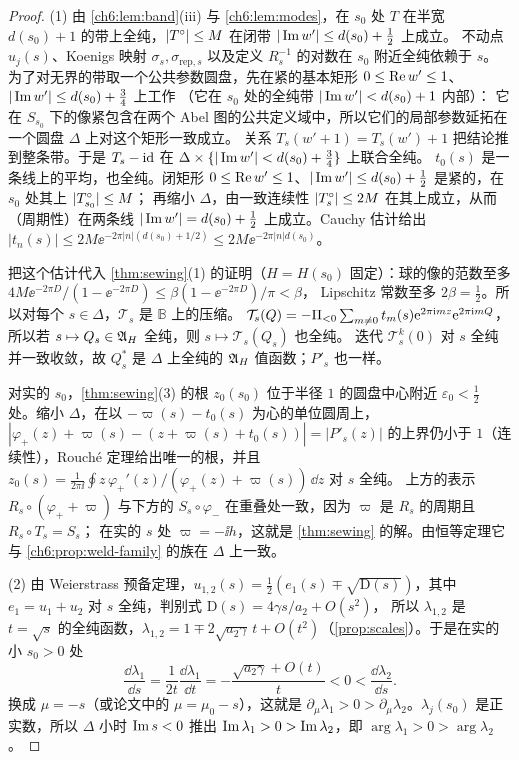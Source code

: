 \begin{proof}
(1) 由 \cref{ch6:lem:band}(iii) 与 \cref{ch6:lem:modes}，在 $s_0$ 处 $T$ 在半宽 $d(s_0)+1$ 的带上全纯，$|T^{\circ}|\le M$ 在闭带 $|\operatorname{Im} w'|\le d(s_0)+\tfrac12$ 上成立。
不动点 $u_j(s)$、Koenigs 映射 $\sigma_s,\sigma_{\mathrm{rep},s}$ 以及定义 $R_s^{-1}$ 的对数在 $s_0$ 附近全纯依赖于 $s$。
为了对无界的带取一个公共参数圆盘，先在紧的基本矩形 $0\le\operatorname{Re} w'\le1$、$|\operatorname{Im} w'|\le d(s_0)+\tfrac34$ 上工作
（它在 $s_0$ 处的全纯带 $|\operatorname{Im} w'|<d(s_0)+1$ 内部）：
它在 $S_{s_0}$ 下的像紧包含在两个 Abel 图的公共定义域中，所以它们的局部参数延拓在一个圆盘 $\Delta$ 上对这个矩形一致成立。
关系 $T_s(w'+1)=T_s(w')+1$ 把结论推到整条带。于是 $T_s-\mathrm{id}$ 在 $\Delta\times\{|\operatorname{Im} w'|<d(s_0)+\tfrac34\}$ 上联合全纯。
$t_0(s)$ 是一条线上的平均，也全纯。闭矩形 $0\le\operatorname{Re} w'\le1$、$|\operatorname{Im} w'|\le d(s_0)+\tfrac12$ 是紧的，在 $s_0$ 处其上 $|T^{\circ}_{s_0}|\le M$；
再缩小 $\Delta$，由一致连续性 $|T^{\circ}_s|\le2M$ 在其上成立，从而（周期性）在两条线 $|\operatorname{Im} w'|=d(s_0)+\tfrac12$ 上成立。Cauchy 估计给出
$|t_n(s)|\le2M\ee^{-2\pi|n|(d(s_0)+1/2)}\le2M\ee^{-2\pi|n|d(s_0)}$。

把这个估计代入 \cref{thm:sewing}(1) 的证明（$H=H(s_0)$ 固定）：球的像的范数至多 $4M\ee^{-2\pi D}/(1-\ee^{-2\pi D})\le\beta(1-\ee^{-2\pi D})/\pi<\beta$，
Lipschitz 常数至多 $2\beta=\tfrac12$。所以对每个 $s\in\Delta$，$\mathcal T_s$ 是 $\mathbb B$ 上的压缩。
$\mathcal T_s(Q)=-\Pi_{<0}\sum_{m\ne0}t_m(s)\mathrm{e}^{2\pi\mathrm{i} mz}\mathrm{e}^{2\pi\mathrm{i} mQ}$，所以若 $s\mapsto Q_s\in\mathfrak A_H$ 全纯，则 $s\mapsto\mathcal T_s(Q_s)$ 也全纯。
迭代 $\mathcal T_s^k(0)$ 对 $s$ 全纯并一致收敛，故 $Q^*_s$ 是 $\Delta$ 上全纯的 $\mathfrak A_H$ 值函数；$P'_s$ 也一样。

对实的 $s_0$，\cref{thm:sewing}(3) 的根 $z_0(s_0)$ 位于半径 $1$ 的圆盘中心附近 $\varepsilon_0<\tfrac12$ 处。缩小 $\Delta$，在以 $-\varpi(s)-t_0(s)$ 为心的单位圆周上，
$|\varphi_+(z)+\varpi(s)-(z+\varpi(s)+t_0(s))|=|P'_s(z)|$ 的上界仍小于 $1$（连续性），Rouché 定理给出唯一的根，并且
$z_0(s)=\frac1{2\pi\ii}\oint z\,\varphi_+'(z)/(\varphi_+(z)+\varpi(s))\,\dd z$ 对 $s$ 全纯。
上方的表示 $R_s\circ(\varphi_++\varpi)$ 与下方的 $S_s\circ\varphi_-$ 在重叠处一致，因为 $\varpi$ 是 $R_s$ 的周期且 $R_s\circ T_s=S_s$；
在实的 $s$ 处 $\varpi=-\ii h$，这就是 \cref{thm:sewing} 的解。由恒等定理它与 \cref{ch6:prop:weld-family} 的族在 $\Delta$ 上一致。

(2) 由 Weierstrass 预备定理，$u_{1,2}(s)=\tfrac12(e_1(s)\mp\sqrt{\mathrm{D}(s)})$，其中 $e_1=u_1+u_2$ 对 $s$ 全纯，判别式 $\mathrm{D}(s)=4\gamma s/a_2+O(s^2)$，
所以 $\lambda_{1,2}$ 是 $t=\sqrt s$ 的全纯函数，$\lambda_{1,2}=1\mp2\sqrt{a_2\gamma}\,t+O(t^2)$（\cref{prop:scales}）。于是在实的小 $s_0>0$ 处
\[
 \frac{\dd\lambda_1}{\dd s}=\frac1{2t}\frac{\dd\lambda_1}{\dd t}=-\frac{\sqrt{a_2\gamma}+O(t)}{t}<0<\frac{\dd\lambda_2}{\dd s}.
\]
换成 $\mu=-s$（或论文中的 $\mu=\mu_0-s$），这就是 $\partial_\mu\lambda_1>0>\partial_\mu\lambda_2$。$\lambda_j(s_0)$ 是正实数，所以 $\Delta$ 小时
$\operatorname{Im} s<0$ 推出 $\operatorname{Im}\lambda_1>0>\operatorname{Im}\lambda_2$，即 $\arg\lambda_1>0>\arg\lambda_2$。


\end{proof}
